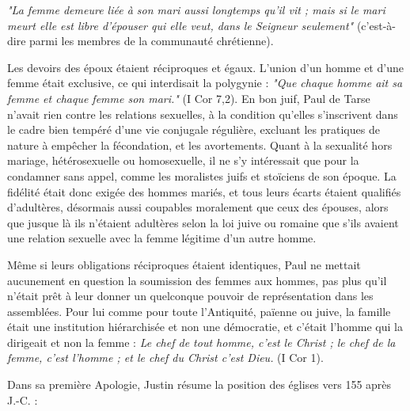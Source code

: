 \begin{displayquote}[I Cor 7,39]
\emph{"La femme demeure liée à son mari aussi longtemps qu'il vit ; mais si le mari meurt elle est libre d'épouser qui elle veut, dans le Seigneur seulement"} (c'est-à-dire parmi les membres de la communauté chrétienne).
\end{displayquote}
 
 Les devoirs des époux étaient réciproques et égaux. L'union d'un homme et d'une femme était exclusive, ce qui interdisait la polygynie : \emph{"Que chaque homme ait sa femme et chaque femme son mari."} (I Cor 7,2). En bon juif, Paul de Tarse n'avait rien contre les relations sexuelles, à la condition qu'elles s'inscrivent dans le cadre bien tempéré d'une vie conjugale régulière, excluant les pratiques de nature à empêcher la fécondation, et les avortements. Quant à la sexualité hors mariage, hétérosexuelle ou homosexuelle, il ne s'y intéressait que pour la condamner sans appel, comme les moralistes juifs et stoïciens de son époque. La fidélité était donc exigée des hommes mariés, et tous leurs écarts étaient qualifiés d'adultères, désormais aussi coupables moralement que ceux des épouses, alors que jusque là ils n'étaient adultères selon la loi juive ou romaine que s'ils avaient une relation sexuelle avec la femme légitime d'un autre homme. 
 
 Même si leurs obligations réciproques étaient identiques, Paul ne mettait aucunement en question la soumission des femmes aux hommes, pas plus qu'il n'était prêt à leur donner un quelconque pouvoir de représentation dans les assemblées. Pour lui comme pour toute l'Antiquité, païenne ou juive, la famille était une institution hiérarchisée et non une démocratie, et c'était l'homme qui la dirigeait et non la femme : \emph{Le chef de tout homme, c'est le Christ ; le chef de la femme, c'est l'homme ; et le chef du Christ c'est Dieu.} (I Cor 1).

\temppagebreak
Dans sa première Apologie, Justin résume la position des églises vers 155 après J.-C. :

